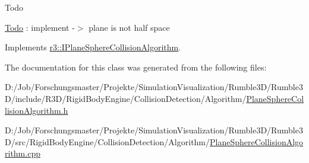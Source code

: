 \begin{DoxyRefDesc}{Todo}
\item[\mbox{\hyperlink{todo__todo000008}{Todo}}]\+: implement -\/$>$ plane is not half space \end{DoxyRefDesc}


Implements \mbox{\hyperlink{classr3_1_1_i_plane_sphere_collision_algorithm_a92ddfd3ba00ed53b183a6aef41b04a60}{r3\+::\+I\+Plane\+Sphere\+Collision\+Algorithm}}.



The documentation for this class was generated from the following files\+:\begin{DoxyCompactItemize}
\item 
D\+:/\+Job/\+Forschungsmaster/\+Projekte/\+Simulation\+Visualization/\+Rumble3\+D/\+Rumble3\+D/include/\+R3\+D/\+Rigid\+Body\+Engine/\+Collision\+Detection/\+Algorithm/\mbox{\hyperlink{_plane_sphere_collision_algorithm_8h}{Plane\+Sphere\+Collision\+Algorithm.\+h}}\item 
D\+:/\+Job/\+Forschungsmaster/\+Projekte/\+Simulation\+Visualization/\+Rumble3\+D/\+Rumble3\+D/src/\+Rigid\+Body\+Engine/\+Collision\+Detection/\+Algorithm/\mbox{\hyperlink{_plane_sphere_collision_algorithm_8cpp}{Plane\+Sphere\+Collision\+Algorithm.\+cpp}}\end{DoxyCompactItemize}
